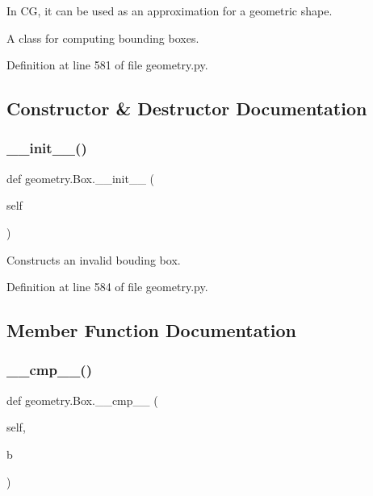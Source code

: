 In CG, it can be used as an approximation for a geometric shape.\begin{DoxyVerb}A class for computing bounding boxes.\end{DoxyVerb}
 

Definition at line 581 of file geometry.\+py.



\subsection{Constructor \& Destructor Documentation}
\mbox{\label{classgeometry_1_1Box_acd3c4e947c8bc7e6fe8efe8a05842238}} 
\subsubsection{\texorpdfstring{\+\_\+\+\_\+init\+\_\+\+\_\+()}{\_\_init\_\_()}}
{\footnotesize\ttfamily def geometry.\+Box.\+\_\+\+\_\+init\+\_\+\+\_\+ (\begin{DoxyParamCaption}\item[{}]{self }\end{DoxyParamCaption})}

\begin{DoxyVerb}Constructs an invalid bouding box.\end{DoxyVerb}
 

Definition at line 584 of file geometry.\+py.



\subsection{Member Function Documentation}
\mbox{\label{classgeometry_1_1Box_ad6bd218082264a42a11c0d36ff3f8ff1}} 
\subsubsection{\texorpdfstring{\+\_\+\+\_\+cmp\+\_\+\+\_\+()}{\_\_cmp\_\_()}}
{\footnotesize\ttfamily def geometry.\+Box.\+\_\+\+\_\+cmp\+\_\+\+\_\+ (\begin{DoxyParamCaption}\item[{}]{self,  }\item[{}]{b }\end{DoxyParamCaption})}

